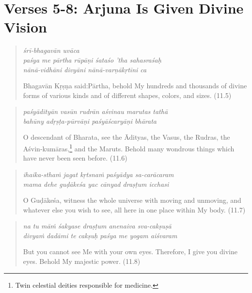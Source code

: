 \documentclass[12pt, twoside, openright]{memoir}
\begin{document}
\section{Verses 5-8: Arjuna Is Given Divine Vision}\label{sec-verses-5-8-arjuna-is-given-divine-vision}


\par
\begin{verse}
\textit{śrī-bhagavān uvāca} \\
\textit{paśya me pārtha rūpāṇi śataśo ’tha sahasraśaḥ} \\
\textit{nānā-vidhāni divyāni nānā-varṇākṛtīni ca}

\noindent \quad Bhagavān Kṛṣṇa said:\linebreak Pārtha, behold My hundreds and thousands of divine forms of various kinds and of different shapes, colors, and sizes. (11.5)
\end{verse}
\par



\par
\begin{verse}
\textit{paśyādityān vasūn rudrān aśvinau marutas tathā} \\
\textit{bahūny adṛṣṭa-pūrvāṇi paśyāścaryāṇi bhārata}

\noindent O descendant of Bharata, see the Ādityas, the Vasus, the Rudras, the Aśvin-kumāras,\footnote{Twin celestial deities responsible for medicine.} and the Maruts. Behold many wondrous things which have never been seen before. (11.6)
\end{verse}
\par



\par
\begin{verse}
\textit{ihaika-sthaṁ jagat kṛtsnaṁ paśyādya sa-carācaram} \\
\textit{mama dehe guḍākeśa yac cānyad draṣṭum icchasi}

\noindent O Guḍākeśa, witness the whole universe with moving and unmoving, and whatever else you wish to see, all here in one place within My body. (11.7)
\end{verse}
\par



\par
\begin{verse}
\textit{na tu māṁ śakyase draṣṭum anenaiva sva-cakṣuṣā} \\
\textit{divyaṁ dadāmi te cakṣuḥ paśya me yogam aiśvaram}

\noindent But you cannot see Me with your own eyes. Therefore, I give you divine eyes. Behold My majestic power. (11.8)
\end{verse}
\par
\end{document}
